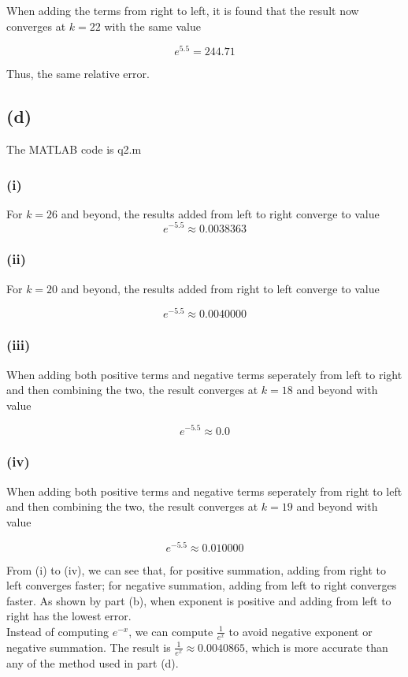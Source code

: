 \documentclass[a4paper, 12pt]{article}
\begin{document}
When adding the terms from right to left, it is found that the result now converges at $k = 22$ with the same value

\[e^{5.5} = 244.71\]

Thus, the same relative error.

\subsection*{(d)}
The MATLAB code is q2.m


\subsubsection*{(i)}

For $k=26$ and beyond, the results added from left to right converge to value
\[e^{-5.5} \approx 0.0038363\]

\subsubsection*{(ii)}
For $k=20$ and beyond, the results added from right to left converge to value

\[e^{-5.5} \approx 0.0040000\]


\subsubsection*{(iii)}
When adding both positive terms and negative terms seperately from left to right and then combining the two, the result converges at $k = 18$ and beyond with value

\[e^{-5.5} \approx 0.0\]


\subsubsection*{(iv)}

When adding both positive terms and negative terms seperately from right to left and then combining the two, the result converges at $k = 19$ and beyond with value

\[e^{-5.5} \approx 0.010000\]

From (i) to (iv), we can see that, for positive summation, adding from right to left converges faster; for negative summation, adding from left to right converges faster. As shown by part (b), when exponent is positive and adding from left to right has the lowest error.\\

Instead of computing $e^{-x}$, we can compute $\frac{1}{e^{x}}$ to avoid negative exponent or negative summation. The result is $\frac{1}{e^{x}} \approx 0.0040865$, which is more accurate than any of the method used in part (d).
\end{document}
